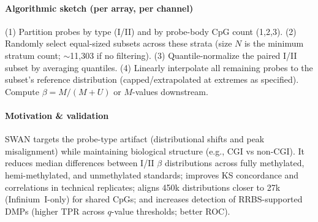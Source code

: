 \documentclass[10pt]{extarticle}
\begin{document}
\paragraph{Algorithmic sketch (per array, per channel)}
(1) Partition probes by type (I/II) and by probe-body CpG count (1,2,3). (2) Randomly select equal-sized subsets across these strata (size $N$ is the minimum stratum count; $\sim$11{,}303 if no filtering). (3) Quantile-normalize the paired I/II subset by averaging quantiles. (4) Linearly interpolate all remaining probes to the subset’s reference distribution (capped/extrapolated at extremes as specified). Compute $\beta = M/(M+U)$ or $M$-values downstream.

\paragraph{Motivation \& validation}
SWAN targets the probe-type artifact (distributional shifts and peak misalignment) while maintaining biological structure (e.g., CGI vs non-CGI). It reduces median differences between I/II $\beta$ distributions across fully methylated, hemi-methylated, and unmethylated standards; improves KS concordance and correlations in technical replicates; aligns 450k distributions closer to 27k (Infinium~I-only) for shared CpGs; and increases detection of RRBS-supported DMPs (higher TPR across $q$-value thresholds; better ROC).
\end{document}
